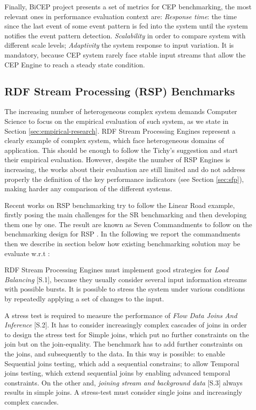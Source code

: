 Finally, BiCEP project presents a set of metrics for CEP benchmarking, the most relevant ones in performance evaluation context are: \textit{Response time}: the time since the last event of some event pattern is fed into the system until the system notifies the event pattern detection. \textit{Scalability} in order to compare system with different scale levels; \textit{Adaptivity} the system response to input variation. It is mandatory, because CEP system rarely face stable input streams that allow the CEP Engine to reach a steady state condition.

\subsection{RDF Stream Processing (RSP) Benchmarks}\label{sec:sr-benchmarking}

The increasing number of heterogeneous complex system demands Computer Science to focus on the empirical evaluation of such system, as we state in Section \ref{sec:empirical-research}. RDF Stream Processing Engines represent a clearly example of complex system, which face heterogeneous domains of application. This should be enough to follow the Tichy's suggestion and start their empirical evaluation. However, despite the number of RSP Engines is increasing, the works about their evaluation are still limited and do not address properly the definition of the key performance indicators (see Section \ref{sec:sfp}), making harder any comparison of  the different systems.

Recent works on RSP benchmarking try to follow the Linear Road example, firstly posing the main challenges for the SR benchmarking  and then developing them one by one. The result are known as Seven Commandments to follow on the benchmarking design for RSP \cite{DBLP:conf/esws/ScharrenbachUMVB13}. In the following we report the commandments then we describe in section below how existing benchmarking solution may be evaluate w.r.t \cite{DBLP:conf/esws/ScharrenbachUMVB13}:
 
RDF Stream Processing Engines must implement good strategies for \textit{Load Balancing} [S.1], because they usually consider several input information streams with possible bursts. It is possible to stress the system under various conditions by repeatedly applying a set of changes to the input.

A stress test is required to measure the performance of \textit{Flow Data Joins And Inference} [S.2]. It has to consider increasingly complex cascades of joins in order to design the stress test for Simple joins, which put no further constraints on the join but on the join-equality. The benchmark has to add further constraints on the joins, and subsequently to the data. In this way is possible: to enable Sequential joins testing, which add a sequential constrains;  to allow Temporal joins testing, which extend sequential joins by enabling advanced temporal constraints. On the other and, \textit{joining stream and background data} [S.3] always results in simple joins. A stress-test must consider single joins and increasingly complex cascades.

